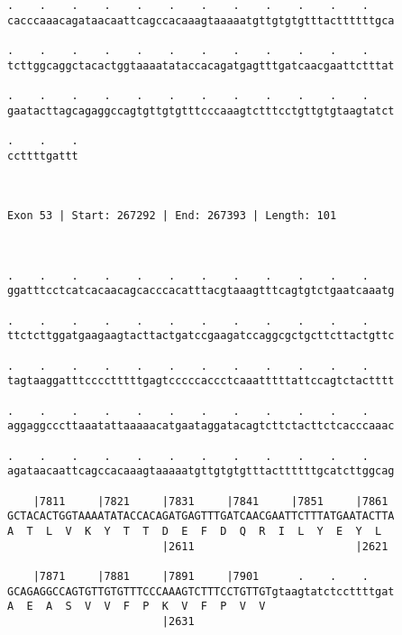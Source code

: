 \documentclass{article}
\begin{document}
\begin{Verbatim}
.    .    .    .    .    .    .    .    .    .    .    .    
cacccaaacagataacaattcagccacaaagtaaaaatgttgtgtgtttacttttttgca
                                                            
.    .    .    .    .    .    .    .    .    .    .    .    
tcttggcaggctacactggtaaaatataccacagatgagtttgatcaacgaattctttat
                                                            
.    .    .    .    .    .    .    .    .    .    .    .    
gaatacttagcagaggccagtgttgtgtttcccaaagtctttcctgttgtgtaagtatct
                                                            
.    .    .
ccttttgattt
           
           
 
Exon 53 | Start: 267292 | End: 267393 | Length: 101



.    .    .    .    .    .    .    .    .    .    .    .    
ggatttcctcatcacaacagcacccacatttacgtaaagtttcagtgtctgaatcaaatg
                                                            
.    .    .    .    .    .    .    .    .    .    .    .    
ttctcttggatgaagaagtacttactgatccgaagatccaggcgctgcttcttactgttc
                                                            
.    .    .    .    .    .    .    .    .    .    .    .    
tagtaaggatttcccctttttgagtcccccaccctcaaatttttattccagtctactttt
                                                            
.    .    .    .    .    .    .    .    .    .    .    .    
aggaggcccttaaatattaaaaacatgaataggatacagtcttctacttctcacccaaac
                                                            
.    .    .    .    .    .    .    .    .    .    .    .    
agataacaattcagccacaaagtaaaaatgttgtgtgtttacttttttgcatcttggcag
                                                            
    |7811     |7821     |7831     |7841     |7851     |7861 
GCTACACTGGTAAAATATACCACAGATGAGTTTGATCAACGAATTCTTTATGAATACTTA
A  T  L  V  K  Y  T  T  D  E  F  D  Q  R  I  L  Y  E  Y  L  
                        |2611                         |2621 
  
    |7871     |7881     |7891     |7901      .    .    .    
GCAGAGGCCAGTGTTGTGTTTCCCAAAGTCTTTCCTGTTGTgtaagtatctccttttgat
A  E  A  S  V  V  F  P  K  V  F  P  V  V                    
                        |2631                               
  

\end{Verbatim}
\end{document}
